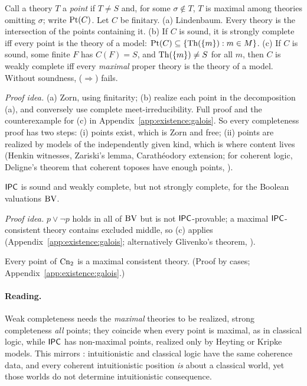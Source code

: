 \begin{theorem}\label{thm:existence:points}
Call a theory $T$ a \emph{point} if $T\neq S$ and, for some $\sigma\notin T$, $T$ is maximal among theories omitting $\sigma$; write $\mathrm{Pt}(C)$. Let $C$ be finitary.
\textup{(a) Lindenbaum.} Every theory is the intersection of the points containing it.
\textup{(b)} If $C$ is sound, it is strongly complete iff every point is the theory of a model: $\mathrm{Pt}(C)\subseteq\{\mathrm{Th}(\{m\}):m\in M\}$.
\textup{(c)} If $C$ is sound, some finite $F$ has $C(F)=S$, and $\mathrm{Th}(\{m\})\neq S$ for all $m$, then $C$ is weakly complete iff every \emph{maximal} proper theory is the theory of a model. Without soundness, ($\Rightarrow$) fails.
\end{theorem}

\emph{Proof idea.} (a) Zorn, using finitarity; (b) realize each point in the decomposition (a), and conversely use complete meet-irreducibility. Full proof and the counterexample for (c) in Appendix~\ref{app:existence:galois}. So every completeness proof has two steps: (i) points exist, which is Zorn and free; (ii) points are realized by models of the independently given kind, which is where content lives (Henkin witnesses, Zariski's lemma, Carath\'eodory extension; for coherent logic, Deligne's theorem that coherent toposes have enough points, \citealt{makkai1977first}).

\begin{proposition}\label{prop:existence:ipc}
$\mathsf{IPC}$ is sound and weakly complete, but not strongly complete, for the Boolean valuations $\mathrm{BV}$.
\end{proposition}

\emph{Proof idea.} $p\vee\neg p$ holds in all of $\mathrm{BV}$ but is not $\mathsf{IPC}$-provable; a maximal $\mathsf{IPC}$-consistent theory contains excluded middle, so (c) applies (Appendix~\ref{app:existence:galois}; alternatively Glivenko's theorem, \citealt{glivenko1929quelques}).

\begin{lemma}\label{lem:existence:cpcpoints}
Every point of $\mathrm{Cn}_2$ is a maximal consistent theory. (Proof by cases; Appendix~\ref{app:existence:galois}.)
\end{lemma}

\paragraph{Reading.} Weak completeness needs the \emph{maximal} theories to be realized, strong completeness \emph{all} points; they coincide when every point is maximal, as in classical logic, while $\mathsf{IPC}$ has non-maximal points, realized only by Heyting or Kripke models. This mirrors : intuitionistic and classical logic have the same coherence data, and every coherent intuitionistic position \emph{is} about a classical world, yet those worlds do not determine intuitionistic consequence.

